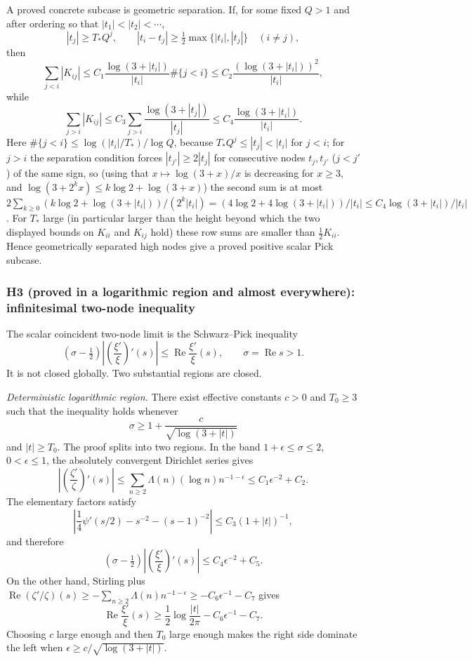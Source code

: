 \documentclass[11pt]{amsart}
\theoremstyle{definition}
\theoremstyle{remark}
\theoremstyle{definition}
\renewcommand{\Re}{\operatorname{Re}}
\newcommand{\half}{\tfrac{1}{2}}
\begin{document}
A proved concrete subcase is geometric separation.  If, for some fixed $Q>1$ and after ordering so
that $|t_1|<|t_2|<\cdots$,
\[
   |t_j|\ge T_*Q^j,\qquad
   |t_i-t_j|\ge\tfrac12\max\{|t_i|,|t_j|\}\quad(i\ne j),
\]
then
\[
   \sum_{j<i}|K_{ij}|
   \le
   C_1\frac{\log(3+|t_i|)}{|t_i|}\#\{j<i\}
   \le
   C_2\frac{(\log(3+|t_i|))^2}{|t_i|},
\]
while
\[
   \sum_{j>i}|K_{ij}|
   \le
   C_3\sum_{j>i}\frac{\log(3+|t_j|)}{|t_j|}
   \le
   C_4\frac{\log(3+|t_i|)}{|t_i|}.
\]
Here $\#\{j<i\}\le\log(|t_i|/T_*)/\log Q$, because $T_*Q^j\le|t_j|<|t_i|$ for $j<i$; for $j>i$ the
separation condition forces $|t_{j'}|\ge2|t_j|$ for consecutive nodes $t_j,t_{j'}$ ($j<j'$) of the same
sign, so (using that $x\mapsto\log(3+x)/x$ is decreasing for $x\ge3$, and
$\log(3+2^kx)\le k\log2+\log(3+x)$) the second sum is at most
$2\sum_{k\ge0}(k\log2+\log(3+|t_i|))/(2^k|t_i|)=(4\log2+4\log(3+|t_i|))/|t_i|\le C_4\log(3+|t_i|)/|t_i|$.
For $T_*$ large (in particular larger than the height beyond which the two displayed bounds on $K_{ii}$
and $K_{ij}$ hold) these row sums are smaller than $\frac12K_{ii}$.  Hence geometrically separated high
nodes give a proved positive scalar Pick subcase.

\subsubsection*{H3 (proved in a logarithmic region and almost everywhere): infinitesimal two-node inequality}

The scalar coincident two-node limit is the Schwarz--Pick inequality
\[
   \left(\sigma-\half\right)
   \left|\left(\frac{\xi'}{\xi}\right)'(s)\right|
   \le
   \Re\frac{\xi'}{\xi}(s),
   \qquad \sigma=\Re s>1.
\]
It is not closed globally.  Two substantial regions are closed.

\emph{Deterministic logarithmic region.}  There exist effective constants $c>0$ and $T_0\ge3$ such that
the inequality holds whenever
\[
   \sigma\ge1+\frac{c}{\sqrt{\log(3+|t|)}}
\]
and $|t|\ge T_0$.  The proof splits into two regions.  In the band $1+\epsilon\le\sigma\le2$,
$0<\epsilon\le1$, the absolutely convergent Dirichlet series gives
\[
   \left|\left(\frac{\zeta'}{\zeta}\right)'(s)\right|
   \le
   \sum_{n\ge2}\Lambda(n)(\log n)n^{-1-\epsilon}
   \le C_1\epsilon^{-2}+C_2.
\]
The elementary factors satisfy
\[
   \left|\frac14\psi'(s/2)-s^{-2}-(s-1)^{-2}\right|
   \le C_3(1+|t|)^{-1},
\]
and therefore
\[
   \left(\sigma-\half\right)
   \left|\left(\frac{\xi'}{\xi}\right)'(s)\right|
   \le C_4\epsilon^{-2}+C_5.
\]
On the other hand, Stirling plus
$\Re(\zeta'/\zeta)(s)\ge-\sum_{n\ge2}\Lambda(n)n^{-1-\epsilon}\ge-C_6\epsilon^{-1}-C_7$
gives
\[
   \Re\frac{\xi'}{\xi}(s)
   \ge
   \frac12\log\frac{|t|}{2\pi}-C_6\epsilon^{-1}-C_7.
\]
Choosing $c$ large enough and then $T_0$ large enough makes the right side dominate the left when
$\epsilon\ge c/\sqrt{\log(3+|t|)}$.
\end{document}
